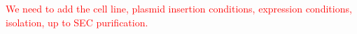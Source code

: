 \textcolor{red}{We need to add the cell line, plasmid insertion conditions, expression conditions, isolation, up to SEC purification.}
